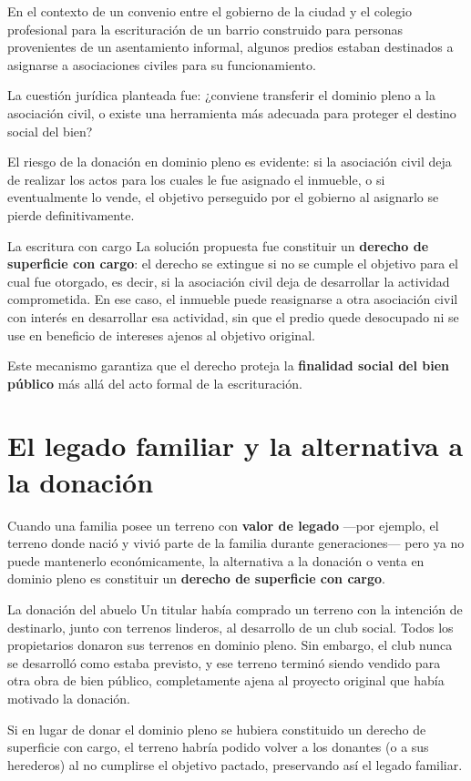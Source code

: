\documentclass[12pt,oneside]{book}
\begin{document}
En el contexto de un convenio entre el gobierno de la ciudad y el colegio profesional para la escrituración de un barrio construido para personas provenientes de un asentamiento informal, algunos predios estaban destinados a asignarse a asociaciones civiles para su funcionamiento.

La cuestión jurídica planteada fue: ¿conviene transferir el dominio pleno a la asociación civil, o existe una herramienta más adecuada para proteger el destino social del bien?

El riesgo de la donación en dominio pleno es evidente: si la asociación civil deja de realizar los actos para los cuales le fue asignado el inmueble, o si eventualmente lo vende, el objetivo perseguido por el gobierno al asignarlo se pierde definitivamente.

\begin{example}{La escritura con cargo}
La solución propuesta fue constituir un \textbf{derecho de superficie con cargo}: el derecho se extingue si no se cumple el objetivo para el cual fue otorgado, es decir, si la asociación civil deja de desarrollar la actividad comprometida. En ese caso, el inmueble puede reasignarse a otra asociación civil con interés en desarrollar esa actividad, sin que el predio quede desocupado ni se use en beneficio de intereses ajenos al objetivo original.
\end{example}

Este mecanismo garantiza que el derecho proteja la \textbf{finalidad social del bien público} más allá del acto formal de la escrituración.

\section{El legado familiar y la alternativa a la donación}

Cuando una familia posee un terreno con \textbf{valor de legado} ---por ejemplo, el terreno donde nació y vivió parte de la familia durante generaciones--- pero ya no puede mantenerlo económicamente, la alternativa a la donación o venta en dominio pleno es constituir un \textbf{derecho de superficie con cargo}.

\begin{example}{La donación del abuelo}
Un titular había comprado un terreno con la intención de destinarlo, junto con terrenos linderos, al desarrollo de un club social. Todos los propietarios donaron sus terrenos en dominio pleno. Sin embargo, el club nunca se desarrolló como estaba previsto, y ese terreno terminó siendo vendido para otra obra de bien público, completamente ajena al proyecto original que había motivado la donación.

Si en lugar de donar el dominio pleno se hubiera constituido un derecho de superficie con cargo, el terreno habría podido volver a los donantes (o a sus herederos) al no cumplirse el objetivo pactado, preservando así el legado familiar.
\end{example}
\end{document}
